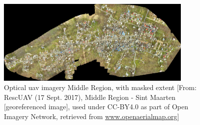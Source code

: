 \begin{figure}[!h]
	\centering
	\captionsetup{justification=raggedright,singlelinecheck=false}
	\includegraphics[width=0.85\textwidth]{figs/DataSetMid.png}
	\caption{\footnotesize{Optical \ac{uav} imagery Middle Region, with masked extent [From: RescUAV (17 Sept. 2017), Middle Region - Sint Maarten [georeferenced image], used under CC-BY4.0 as part of Open Imagery Network, retrieved from \url{www.openaerialmap.org}]}}
	\label{fig:MidHSV}
\end{figure}


